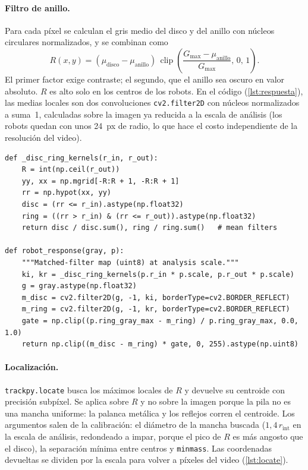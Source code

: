\paragraph{Filtro de anillo.} Para cada píxel se calculan el gris medio del disco y del anillo con
núcleos circulares normalizados, y se combinan como
\begin{equation}
  R(x,y) = \left(\mu_{\mathrm{disco}}-\mu_{\mathrm{anillo}}\right)\,
           \operatorname{clip}\!\left(\frac{G_{\max}-\mu_{\mathrm{anillo}}}{G_{\max}},\,0,\,1\right).
\end{equation}
El primer factor exige contraste; el segundo, que el anillo sea oscuro en valor absoluto. $R$ es alto
solo en los centros de los robots. En el código (\cref{lst:respuesta}), las medias locales son dos
convoluciones \texttt{cv2.filter2D} con núcleos normalizados a suma~1, calculadas sobre la imagen ya
reducida a la escala de análisis (los robots quedan con unos \SI{24}{px} de radio, lo que hace el
costo independiente de la resolución del video).

\begin{lstlisting}[caption={Filtro de anillo (\texttt{core/detection.py}).}, label=lst:respuesta]
def _disc_ring_kernels(r_in, r_out):
    R = int(np.ceil(r_out))
    yy, xx = np.mgrid[-R:R + 1, -R:R + 1]
    rr = np.hypot(xx, yy)
    disc = (rr <= r_in).astype(np.float32)
    ring = ((rr > r_in) & (rr <= r_out)).astype(np.float32)
    return disc / disc.sum(), ring / ring.sum()   # mean filters

def robot_response(gray, p):
    """Matched-filter map (uint8) at analysis scale."""
    ki, kr = _disc_ring_kernels(p.r_in * p.scale, p.r_out * p.scale)
    g = gray.astype(np.float32)
    m_disc = cv2.filter2D(g, -1, ki, borderType=cv2.BORDER_REFLECT)
    m_ring = cv2.filter2D(g, -1, kr, borderType=cv2.BORDER_REFLECT)
    gate = np.clip((p.ring_gray_max - m_ring) / p.ring_gray_max, 0.0, 1.0)
    return np.clip((m_disc - m_ring) * gate, 0, 255).astype(np.uint8)
\end{lstlisting}

\paragraph{Localización.} \texttt{trackpy.locate} busca los máximos locales de $R$ y devuelve su
centroide con precisión subpíxel. Se aplica sobre $R$ y no sobre la imagen porque la pila no es una
mancha uniforme: la palanca metálica y los reflejos corren el centroide. Los argumentos salen de la
calibración: el diámetro de la mancha buscada ($1{,}4\,r_{\mathrm{int}}$ en la escala de análisis,
redondeado a impar, porque el pico de $R$ es más angosto que el disco), la separación mínima entre
centros y \texttt{minmass}. Las coordenadas devueltas se dividen por la escala para volver a píxeles
del video (\cref{lst:locate}).

